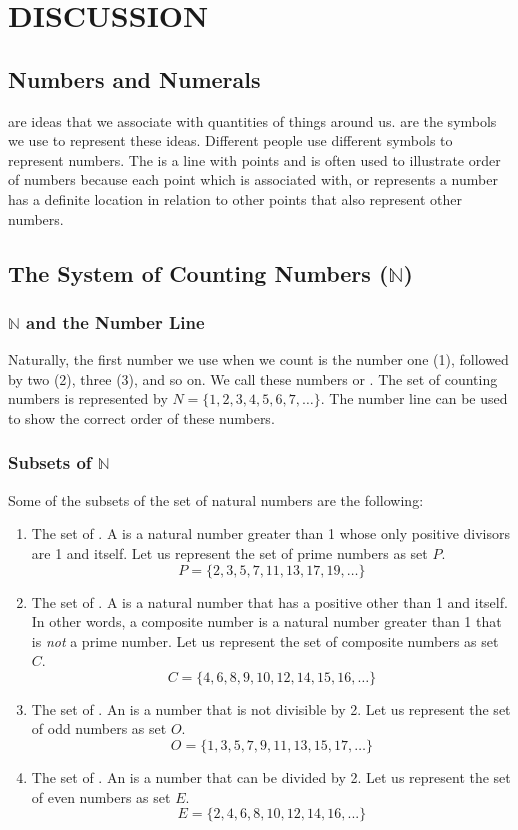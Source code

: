 \section*{DISCUSSION}
\subsection*{Numbers and Numerals}
 are ideas that we associate with quantities of things around us.  are the
symbols we use to represent these ideas. Different people use different symbols to represent
numbers. The  is a line with points and is often used to illustrate order of numbers
because each point which is associated with, or represents a number has a definite location in
relation to other points that also represent other numbers.
\subsection*{The System of Counting Numbers ($\mathbb{N}$)}
\subsubsection*{$\mathbb{N}$ and the Number Line}
Naturally, the first number we use when we count is the number one (1), followed by two (2),
three (3), and so on. We call these numbers  or . The set of counting
numbers is represented by $N = \{1, 2, 3, 4, 5, 6, 7, \ldots\}$. The number line can be used to show the
correct order of these numbers.
\subsubsection*{Subsets of $\mathbb{N}$}
Some of the subsets of the set of natural numbers are the following:
\begin{enumerate}
\item The set of . A  is a natural number greater than 1 whose only
positive divisors are 1 and itself. Let us represent the set of prime numbers as set $P$.
\[P=\{2,3,5,7,11,13,17,19,\ldots\}\]
\item The set of . A  is a natural number that has a positive
other than 1 and itself. In other words, a composite number is a natural number greater than 1
that is \textit{not} a prime number. Let us represent the set of composite numbers as set $C$.
\[C = \{4, 6, 8, 9, 10, 12, 14, 15, 16, \ldots\}\]
\item The set of . An  is a number that is not divisible by 2. Let us represent
the set of odd numbers as set $O$.
\[O = \{1, 3, 5, 7, 9, 11, 13, 15, 17, \ldots\}\]
\item The set of . An  is a number that can be divided by 2. Let us represent
the set of even numbers as set $E$.
\[E = \{2, 4, 6, 8, 10, 12, 14, 16, ...\}\]
\end{enumerate}
